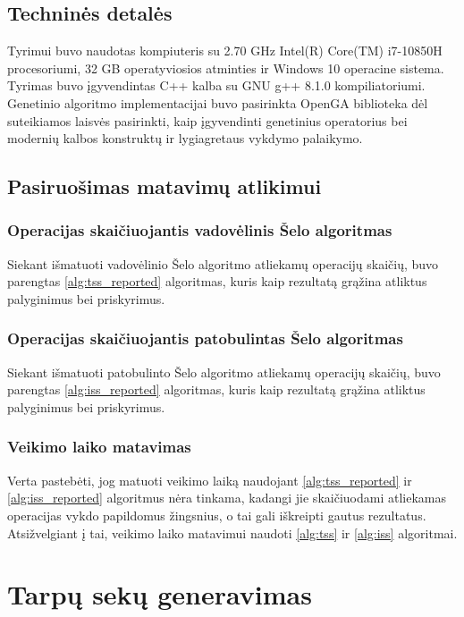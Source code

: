 \documentclass{VUMIFInfKursinis}
\begin{document}
\subsection{Techninės detalės}
Tyrimui buvo naudotas kompiuteris su 2.70 GHz Intel(R) Core(TM) i7-10850H procesoriumi,
32 GB operatyviosios atminties ir Windows 10 operacine sistema.
Tyrimas buvo įgyvendintas C++ kalba su GNU g++ 8.1.0 kompiliatoriumi.
Genetinio algoritmo implementacijai buvo pasirinkta OpenGA biblioteka \cite{mohammadi2017openga}
dėl suteikiamos laisvės pasirinkti, kaip įgyvendinti genetinius operatorius bei modernių kalbos konstruktų ir lygiagretaus vykdymo palaikymo.

\subsection{Pasiruošimas matavimų atlikimui}

\subsubsection{Operacijas skaičiuojantis vadovėlinis Šelo algoritmas}

Siekant išmatuoti vadovėlinio Šelo algoritmo atliekamų operacijų skaičių,
buvo parengtas \ref{alg:tss_reported} algoritmas, kuris kaip rezultatą grąžina atliktus palyginimus bei priskyrimus.

\subsubsection{Operacijas skaičiuojantis patobulintas Šelo algoritmas}

Siekant išmatuoti patobulinto Šelo algoritmo atliekamų operacijų skaičių,
buvo parengtas \ref{alg:iss_reported} algoritmas, kuris kaip rezultatą grąžina atliktus palyginimus bei priskyrimus.

\subsubsection{Veikimo laiko matavimas}

Verta pastebėti, jog matuoti veikimo laiką naudojant \ref{alg:tss_reported} ir \ref{alg:iss_reported} algoritmus nėra tinkama,
kadangi jie skaičiuodami atliekamas operacijas vykdo papildomus žingsnius, o tai gali iškreipti gautus rezultatus.
Atsižvelgiant į tai, veikimo laiko matavimui naudoti \ref{alg:tss} ir \ref{alg:iss} algoritmai. 

\section{Tarpų sekų generavimas}
\end{document}

